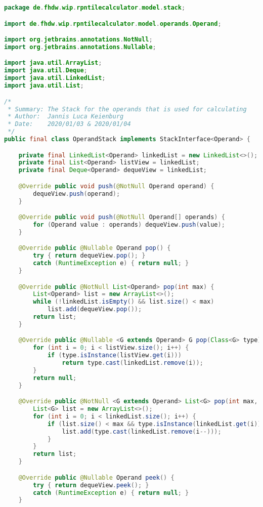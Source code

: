 \begin{lstlisting}[caption=OperandStack (Keienburg),label=list:OperandStack,language=Java]
package de.fhdw.wip.rpntilecalculator.model.stack;

import de.fhdw.wip.rpntilecalculator.model.operands.Operand;

import org.jetbrains.annotations.NotNull;
import org.jetbrains.annotations.Nullable;

import java.util.ArrayList;
import java.util.Deque;
import java.util.LinkedList;
import java.util.List;

/*
 * Summary: The Stack for the operands that is used for calculating
 * Author:  Jannis Luca Keienburg
 * Date:    2020/01/03 & 2020/01/04
 */
public final class OperandStack implements StackInterface<Operand> {

    private final LinkedList<Operand> linkedList = new LinkedList<>();
    private final List<Operand> listView = linkedList;
    private final Deque<Operand> dequeView = linkedList;

    @Override public void push(@NotNull Operand operand) {
        dequeView.push(operand);
    }

    @Override public void push(@NotNull Operand[] operands) {
        for (Operand value : operands) dequeView.push(value);
    }

    @Override public @Nullable Operand pop() {
        try { return dequeView.pop(); }
        catch (RuntimeException e) { return null; }
    }

    @Override public @NotNull List<Operand> pop(int max) {
        List<Operand> list = new ArrayList<>();
        while (!linkedList.isEmpty() && list.size() < max)
            list.add(dequeView.pop());
        return list;
    }

    @Override public @Nullable <G extends Operand> G pop(Class<G> type) {
        for (int i = 0; i < listView.size(); i++) {
            if (type.isInstance(listView.get(i)))
                return type.cast(linkedList.remove(i));
        }
        return null;
    }

    @Override public @NotNull <G extends Operand> List<G> pop(int max, Class<G> type) {
        List<G> list = new ArrayList<>();
        for (int i = 0; i < linkedList.size(); i++) {
            if (list.size() < max && type.isInstance(linkedList.get(i))) {
                list.add(type.cast(linkedList.remove(i--)));
            }
        }
        return list;
    }

    @Override public @Nullable Operand peek() {
        try { return dequeView.peek(); }
        catch (RuntimeException e) { return null; }
    }


\end{lstlisting}
